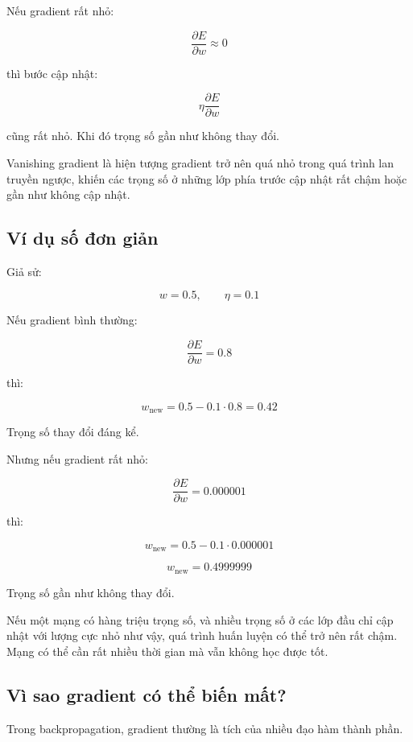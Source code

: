 Nếu gradient rất nhỏ:

\[
    \frac{\partial E}{\partial w} \approx 0
\]

thì bước cập nhật:

\[
    \eta \frac{\partial E}{\partial w}
\]

cũng rất nhỏ. Khi đó trọng số gần như không thay đổi.

\begin{ghinho}
Vanishing gradient là hiện tượng gradient trở nên quá nhỏ trong quá trình lan truyền ngược, khiến các trọng số ở những lớp phía trước cập nhật rất chậm hoặc gần như không cập nhật.
\end{ghinho}

\subsection{Ví dụ số đơn giản}

Giả sử:

\[
    w = 0.5,\qquad \eta = 0.1
\]

Nếu gradient bình thường:

\[
    \frac{\partial E}{\partial w}=0.8
\]

thì:

\[
    w_{\text{new}}
    =
    0.5 - 0.1 \cdot 0.8
    =
    0.42
\]

Trọng số thay đổi đáng kể.

Nhưng nếu gradient rất nhỏ:

\[
    \frac{\partial E}{\partial w}=0.000001
\]

thì:

\[
    w_{\text{new}}
    =
    0.5 - 0.1 \cdot 0.000001
\]

\[
    w_{\text{new}}
    =
    0.4999999
\]

Trọng số gần như không thay đổi.

\begin{vidu}
Nếu một mạng có hàng triệu trọng số, và nhiều trọng số ở các lớp đầu chỉ cập nhật với lượng cực nhỏ như vậy, quá trình huấn luyện có thể trở nên rất chậm. Mạng có thể cần rất nhiều thời gian mà vẫn không học được tốt.
\end{vidu}

\subsection{Vì sao gradient có thể biến mất?}

Trong backpropagation, gradient thường là tích của nhiều đạo hàm thành phần.

